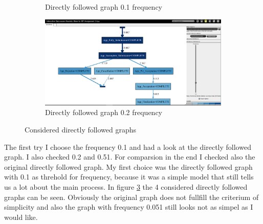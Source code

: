 \begin{figure}[!htbp]
\begin{subfigure}{.4\textwidth}
  \caption{Directly followed graph 0.1 frequency}
  \label{fig:APP_DFG0-1}
\end{subfigure}
\begin{subfigure}{.4\textwidth}
  \centering
  \includegraphics[width=\linewidth]{App_DirectlyFollowedFreq0-2.PNG}
  \caption{Directly followed graph 0.2 frequency}
  \label{fig:APP_DFG0-2}
\end{subfigure}
\caption{Considered directly followed graphs}
\label{fig:App_Direct}
\end{figure}

The first try I choose the frequency 0.1 and had a look at the directly followed graph. I also checked 0.2 and 0.51. For comparsion in the end I checked also the original directly followed graph. My first choice was the directly followed graph with 0.1 as threhold for frequency, because it was a simple model that still tells us a lot about the main process. In figure \ref{fig:App_Direct} the 4 considered directly followed graphs can be seen. Obviously the original graph does not fullfill the criterium of simplicity and also the graph with frequency 0.051 still looks not as simpel as I would like.

